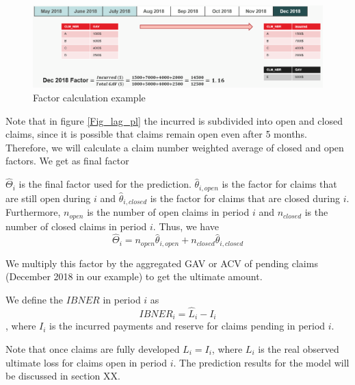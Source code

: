 	\begin{figure}[H]
		\begin{center}
			\includegraphics[scale=0.4]{Graphiques/factor_example} 
			\renewcommand{\figurename}{Figure}
			\caption{Factor calculation example}\label{Fig_factor_example}
		\end{center}
	\end{figure}
	Note that in figure \ref{Fig_lag_pl} the incurred is subdivided into open and closed claims, since it is possible that claims remain open even after 5 months. Therefore, we will calculate a claim number weighted average of closed and open factors. We get as final factor
	\begin{Definition}\label{Def_final_factor}
		$\hat{\Theta}_i$ is the final factor used for the prediction. $\hat{\theta}_{i,open}$ is the factor for claims that are still open during $i$ and  $\hat{\theta}_{i,closed}$ is the factor for claims that are closed during $i$. Furthermore, $n_{open}$ is the number of open claims in period $i$ and $n_{closed}$ is the number of closed claims in period $i$. Thus, we have
		$$\hat{\Theta}_i = n_{open} \hat{\theta}_{i,open} + n_{closed} \hat{\theta}_{i,closed}$$ 
	\end{Definition}
	
	We multiply this factor by the aggregated GAV or ACV of pending claims (December 2018 in our example) to get the ultimate amount.
	
	\begin{Definition}
		We define the $IBNER$ in period $i$ as
		$$IBNER_i = \hat{L}_i - I_i$$
		, where $I_i$ is the incurred payments and reserve for claims pending in period $i$.
	\end{Definition}
	Note that once claims are fully developed $L_i = I_i$, where $L_i$ is the real observed ultimate loss for claims open in period $i$. 
	The prediction results for the model will be discussed in section XX.
	
